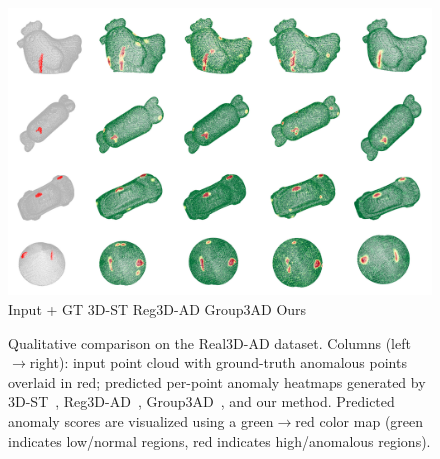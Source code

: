 \begin{figure}[!ht]
    \includegraphics[width=\linewidth]{figs/real3d}
    Input + GT \hspace{1.2cm} 3D-ST \cite{bergmann2023anomaly} \hspace{1.3cm} Reg3D-AD \cite{liu2023real3d} \hspace{1.3cm} Group3AD   \cite{zhu2024towards} \hspace{1.7cm} Ours \hspace{1.5cm}
    \caption{Qualitative comparison on the Real3D-AD dataset. Columns (left$\rightarrow$right): input point cloud with ground-truth anomalous points overlaid in red; predicted per-point anomaly heatmaps generated by 3D-ST~\cite{bergmann2023anomaly}, Reg3D-AD~\cite{liu2023real3d}, Group3AD~\cite{zhu2024towards}, and our method. Predicted anomaly scores are visualized using a green$\rightarrow$red color map (green indicates low/normal regions, red indicates high/anomalous regions).}
    \label{fig:real3d}
\end{figure}


